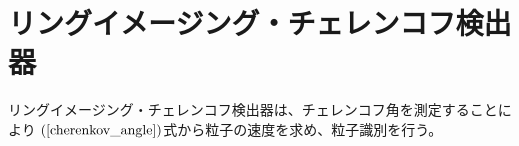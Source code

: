 \section{リングイメージング・チェレンコフ検出器}
リングイメージング・チェレンコフ検出器は、チェレンコフ角を測定することにより
$(\ref{cherenkov_angle})$式から粒子の速度を求め、粒子識別を行う。